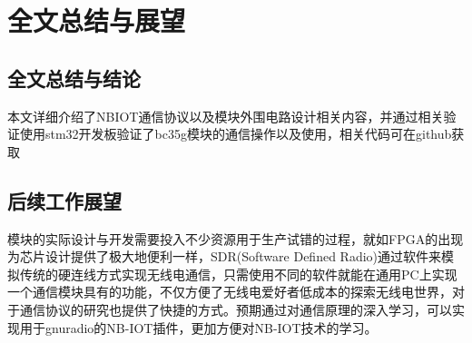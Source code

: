 \chapter{全文总结与展望}

\section{全文总结与结论}

本文详细介绍了NBIOT通信协议以及模块外围电路设计相关内容，并通过相关验证使用stm32开发板验证了bc35g模块的通信操作以及使用，相关代码可在github\cite{wsq_git}获取

\section{后续工作展望}

模块的实际设计与开发需要投入不少资源用于生产试错的过程，就如FPGA的出现为芯片设计提供了极大地便利一样，SDR(Software Defined Radio)通过软件来模拟传统的硬连线方式实现无线电通信，只需使用不同的软件就能在通用PC上实现一个通信模块具有的功能，不仅方便了无线电爱好者低成本的探索无线电世界，对于通信协议的研究也提供了快捷的方式。预期通过对通信原理的深入学习，可以实现用于gnuradio的NB-IOT插件，更加方便对NB-IOT技术的学习。